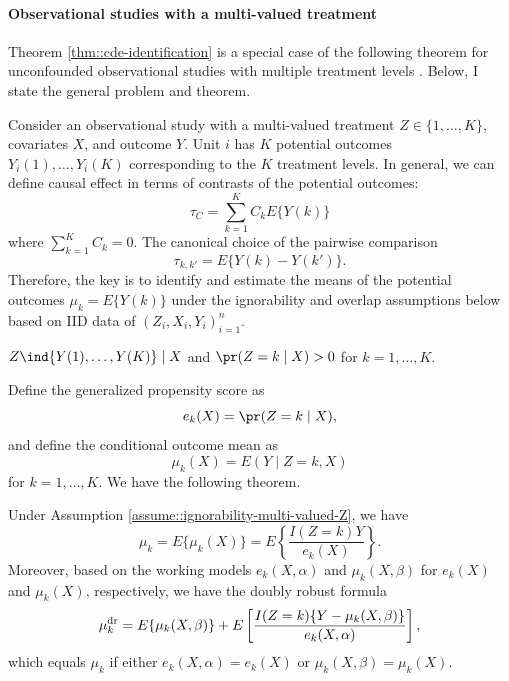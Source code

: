  \paragraph{Observational studies with a multi-valued treatment}\label{para::obs-multi-valued-Z}
  
Theorem \ref{thm::cde-identification} is a special case of the following theorem for unconfounded observational studies with multiple treatment levels \citep{imai2004causal, cattaneo2010efficient}. Below, I state the general problem and theorem. 



Consider an observational study with a multi-valued treatment $Z \in \{ 1, \ldots, K \}$, covariates $X$, and outcome $Y$. Unit $i$ has $K$ potential outcomes $Y_i(1), \ldots, Y_i(K)$ corresponding to the $K$ treatment levels. In general, we can define causal effect in terms of contrasts of the potential outcomes:
$$
\tau_C  = \sum_{k=1}^K C_k   E\{  Y(k) \}
$$
where $  \sum_{k=1}^K C_k  = 0$. The canonical choice of the pairwise comparison
$$
\tau_{k,k'} = E\{   Y(k) - Y(k') \}.
$$
Therefore, the key is to identify and estimate the means of the potential outcomes $\mu_k  =  E\{  Y(k) \}$ under the ignorability and overlap assumptions below based on IID data of $(Z_i,  X_i, Y_i)_{i=1}^n$.



\begin{assumption}
\label{assume::ignorability-multi-valued-Z}
$Z\ind \{ Y (1), \ldots, Y (K) \} \mid X$ and $\pr(Z = k \mid X) > 0$ for $k=1,\ldots, K.$
\end{assumption}



Define the generalized propensity score as
$$
e_k(X) = \pr(Z = k \mid X), 
$$
and define the conditional outcome mean as
$$
\mu_k(X) = E(   Y \mid Z=k,  X )
$$
for $k=1, \ldots, K.$ We have the following theorem.

\begin{theorem}
\label{thm::treatment-multi-valued-Z}
Under Assumption \ref{assume::ignorability-multi-valued-Z}, we have
$$
\mu_{k} = E\{  \mu_{k}(X) \}
= E \left\{   \frac{I(Z = k) Y}{  e_{k}(X)  }  \right\} .
$$
Moreover, based on the working models $e_{k}(X, \alpha) $ and $\mu_{k}(X, \beta) $ for $e_{k}(X) $ and $\mu_{k}(X) $, respectively, we have the doubly robust  formula 
$$
\mu_{k}^{\textup{dr}}  = E\{  \mu_{k}(X, \beta) \} + E \left[   \frac{I(Z=k) \{ Y - \mu_{k}(X, \beta)  \}}{  e_{k}(X, \alpha)  }  \right],
$$
which equals $\mu_{k} $ if either $e_{k}(X, \alpha) = e_{k}(X)$ or $\mu_{k}(X, \beta)  = \mu_{k}(X)$. 
\end{theorem}



